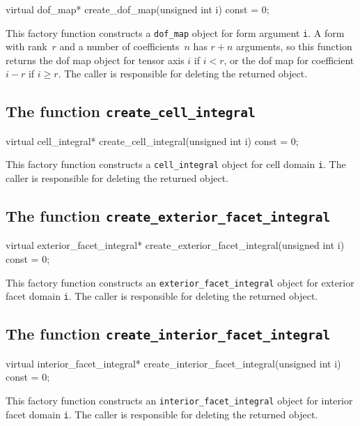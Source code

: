 \begin{code}
virtual dof_map*
create_dof_map(unsigned int i) const = 0;
\end{code}

This factory function constructs a \texttt{dof\_map} object for form
argument \texttt{i}. A form with rank~$r$ and a number of
coefficients~$n$ has $r + n$ arguments, so this function
returns the dof map object for tensor axis $i$ if $i < r$, or the dof
map for coefficient $i - r$ if $i \geq r$.  The caller is responsible
for deleting the returned object.

\subsection{The function \texttt{create\_cell\_integral}}

\begin{code}
virtual cell_integral*
create_cell_integral(unsigned int i) const = 0;
\end{code}

This factory function constructs a \texttt{cell\_integral} object for
cell domain \texttt{i}. The caller is responsible for deleting the
returned object.

\subsection{The function \texttt{create\_exterior\_facet\_integral}}

\begin{code}
virtual exterior_facet_integral*
create_exterior_facet_integral(unsigned int i) const = 0;
\end{code}

This factory function constructs an \texttt{exterior\_facet\_integral}
object for exterior facet domain \texttt{i}. The caller is responsible
for deleting the returned object.

\subsection{The function \texttt{create\_interior\_facet\_integral}}

\begin{code}
virtual interior_facet_integral*
create_interior_facet_integral(unsigned int i) const = 0;
\end{code}

This factory function constructs an \texttt{interior\_facet\_integral}
object for interior facet domain \texttt{i}. The caller is responsible
for deleting the returned object.

